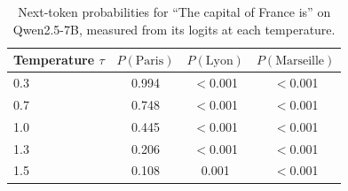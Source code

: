 \begin{table}[h]
\centering
\begin{tabular}{lccc}
\toprule
Temperature $\tau$ & $P(\text{Paris})$ & $P(\text{Lyon})$ & $P(\text{Marseille})$ \\
\midrule
0.3 & 0.994 & $<$0.001 & $<$0.001 \\
0.7 & 0.748 & $<$0.001 & $<$0.001 \\
1.0 & 0.445 & $<$0.001 & $<$0.001 \\
1.3 & 0.206 & $<$0.001 & $<$0.001 \\
1.5 & 0.108 & 0.001 & $<$0.001 \\
\bottomrule
\end{tabular}
\caption{Next-token probabilities for ``The capital of France is'' on Qwen2.5-7B, measured from its logits at each temperature.}
\label{tab:token-example}
\end{table}
